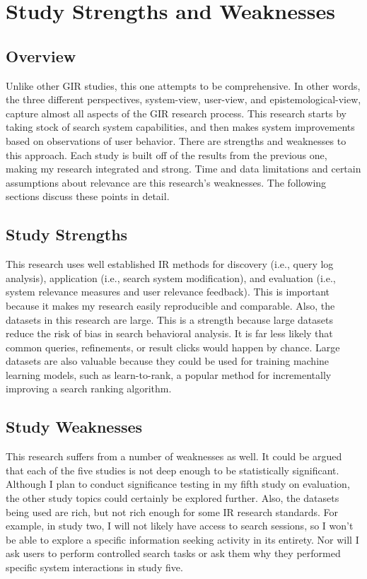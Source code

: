 \chapter{Study Strengths and Weaknesses} \label{ch:[chapter 7 label]}

\section{Overview}

Unlike other GIR studies, this one attempts to be comprehensive. In other words, the three different perspectives, system-view, user-view, and epistemological-view, capture almost all aspects of the GIR research process. This research starts by taking stock of search system capabilities, and then makes system improvements based on observations of user behavior. There are strengths and weaknesses to this approach. Each study is built off of the results from the previous one, making my research integrated and strong. Time and data limitations and certain assumptions about relevance are this research’s weaknesses. The following sections discuss these points in detail.

\section{Study Strengths}

This research uses well established IR methods for discovery (i.e., query log analysis), application (i.e., search system modification), and evaluation (i.e., system relevance measures and user relevance feedback). This is important because it makes my research easily reproducible and comparable. Also, the datasets in this research are large. This is a strength because large datasets reduce the risk of bias in search behavioral analysis. It is far less likely that common queries, refinements, or result clicks would happen by chance. Large datasets are also valuable because they could be used for training machine learning models, such as learn-to-rank, a popular method for incrementally improving a search ranking algorithm.

\section{Study Weaknesses}

This research suffers from a number of weaknesses as well. It could be argued that each of the five studies is not deep enough to be statistically significant. Although I plan to conduct significance testing in my fifth study on evaluation, the other study topics could certainly be explored further. Also, the datasets being used are rich, but not rich enough for some IR research standards. For example, in study two, I will not likely have access to search sessions, so I won’t be able to explore a specific information seeking activity in its entirety. Nor will I ask users to perform controlled search tasks or ask them why they performed specific system interactions in study five.

